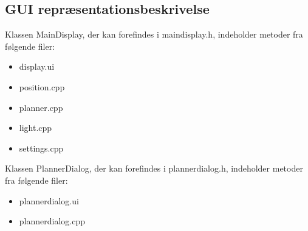 \subsection{GUI repræsentationsbeskrivelse}

Klassen MainDisplay, der kan forefindes i maindisplay.h, indeholder metoder fra følgende filer:
\begin{itemize}
\item display.ui
\item position.cpp
\item planner.cpp
\item light.cpp
\item settings.cpp
\end{itemize}

Klassen PlannerDialog, der kan forefindes i plannerdialog.h, indeholder metoder fra følgende filer:
\begin{itemize}
\item plannerdialog.ui
\item plannerdialog.cpp
\end{itemize}

